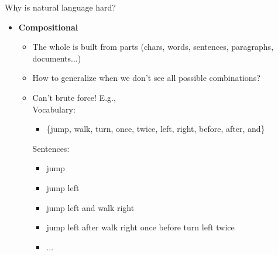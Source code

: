 \documentclass[usenames,dvipsnames,notes,11pt,aspectratio=169]{beamer}
\begin{document}
\begin{frame}
    {Why is natural language hard?}
    \begin{itemize}
        \item \textbf{Compositional}
            \begin{itemize}
                \item The whole is built from parts (chars, words, sentences, paragraphs, documents...)
                \item How to generalize when we don't see all possible combinations?\\
                \item Can't brute force! E.g., \\
                Vocabulary:\\
                    \begin{itemize}
                    \item[]\{jump, walk, turn, once, twice, left, right, before, after, and\}
                    \end{itemize}
                Sentences: \\
                    \begin{itemize}
                       \item[]jump \\
                       \item[]jump left\\
                       \item[]jump left and walk right \\
                       \item[]jump left after walk right once before turn left twice\\
                       \item[]...
                    \end{itemize}
            \end{itemize}
    \end{itemize}
\end{frame}
\end{document}
